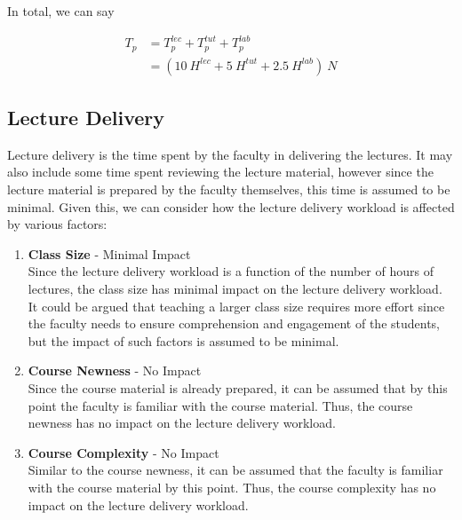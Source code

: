 In total, we can say

\begin{equation}
  \label{eqn:preparation-workload-total}
  \begin{aligned}
    T_p & = T_p^{lec} + T_p^{tut} + T_p^{lab}            \\
        & = (10\ H^{lec} + 5\ H^{tut} + 2.5\ H^{lab})\ N
  \end{aligned}
\end{equation}

\subsection{Lecture Delivery}

Lecture delivery is the time spent by the faculty in delivering the lectures. It may also include some time spent reviewing the lecture material, however since the lecture material is prepared by the faculty themselves, this time is assumed to be minimal. Given this, we can consider how the lecture delivery workload is affected by various factors:

\begin{enumerate}
  \item \textbf{Class Size} - Minimal Impact \\
        Since the lecture delivery workload is a function of the number of hours of lectures, the class size has minimal impact on the lecture delivery workload. It could be argued that teaching a larger class size requires more effort since the faculty needs to ensure comprehension and engagement of the students, but the impact of such factors is assumed to be minimal.

  \item \textbf{Course Newness} - No Impact \\
        Since the course material is already prepared, it can be assumed that by this point the faculty is familiar with the course material. Thus, the course newness has no impact on the lecture delivery workload.

  \item \textbf{Course Complexity} - No Impact \\
        Similar to the course newness, it can be assumed that the faculty is familiar with the course material by this point. Thus, the course complexity has no impact on the lecture delivery workload.

\end{enumerate}

